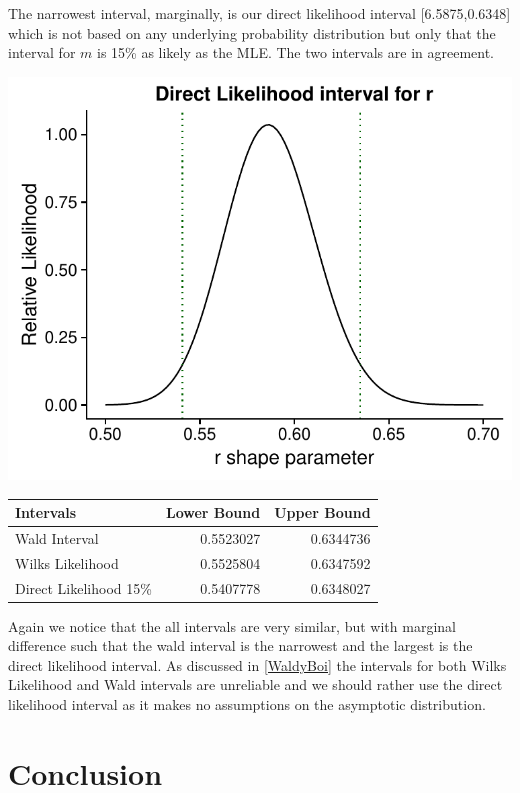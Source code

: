 \documentclass[11pt,preprint, authoryear]{elsarticle}
\let\origtable\table
\let\endorigtable\endtable
\renewenvironment{table}[1][2] {
    \expandafter\origtable\expandafter[H]
} {
    \endorigtable
}
\numberwithin{equation}{section}
\numberwithin{figure}{section}
\numberwithin{table}{section}
\begin{document}
The narrowest interval, marginally, is our direct likelihood interval
{[}6.5875,0.6348{]} which is not based on any underlying probability
distribution but only that the interval for \(m\) is 15\% as likely as
the MLE. The two intervals are in agreement.

\includegraphics{likelihood_files/figure-latex/unnamed-chunk-11-1.pdf}

\begin{table}

\caption{\label{tab:unnamed-chunk-12}Intervals for r parameter}
\centering
\begin{tabular}[t]{lrr}
\toprule
Intervals & Lower Bound & Upper Bound\\
\midrule
Wald Interval & 0.5523027 & 0.6344736\\
Wilks Likelihood & 0.5525804 & 0.6347592\\
Direct Likelihood 15\% & 0.5407778 & 0.6348027\\
\bottomrule
\end{tabular}
\end{table}

Again we notice that the all intervals are very similar, but with
marginal difference such that the wald interval is the narrowest and the
largest is the direct likelihood interval. As discussed in
\ref{WaldyBoi} the intervals for both Wilks Likelihood and Wald
intervals are unreliable and we should rather use the direct likelihood
interval as it makes no assumptions on the asymptotic distribution.

\section{Conclusion}\label{conclusion}
\end{document}
